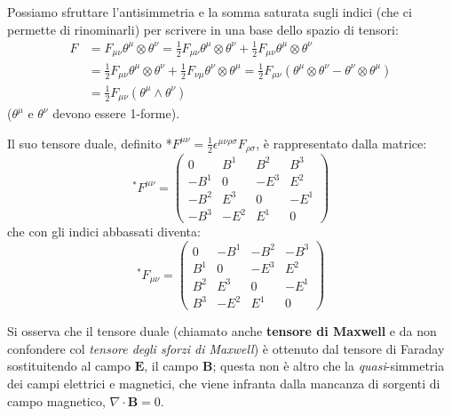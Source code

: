 Possiamo sfruttare l'antisimmetria e la somma saturata sugli indici (che ci permette di rinominarli) per scrivere in una base dello spazio di tensori:
\begin{align*}
    F &= F_{\mu\nu}\theta^\mu \otimes \theta^\nu = \frac{1}{2}F_{\mu\nu}\theta^\mu \otimes \theta^\nu + \frac{1}{2}F_{\mu\nu}\theta^\mu \otimes \theta^\nu \\
    &= \frac{1}{2}F_{\mu\nu}\theta^\mu \otimes \theta^\nu + \frac{1}{2}F_{\nu\mu}\theta^\nu \otimes \theta^\mu
    = \frac{1}{2}F_{\mu\nu}(\theta^\mu \otimes \theta^\nu - \theta^\nu \otimes \theta^\mu) \\
    &= \frac{1}{2}F_{\mu\nu}(\theta^{\mu} \wedge \theta^{\nu} )
\end{align*}
($\theta^\mu$ e $\theta^\nu$ devono essere 1-forme).

Il suo tensore duale, definito *$F^{\mu\nu} = \frac{1}{2}\epsilon^{\mu\nu\rho\sigma}F_{\rho\sigma}$, è rappresentato dalla matrice:
\begin{equation*}
^*F^{\mu\nu} =
    \begin{pmatrix}
    0 & B^1 & B^2 & B^3\\
    -B^1 & 0 & - E^3 & E^2 \\
    -B^2 & E^3 & 0 & -E^1 \\
    -B^3 & -E^2 & E^1 & 0
    \end{pmatrix}
\end{equation*}
che con gli indici abbassati diventa:
\begin{equation*}
    ^*F_{\mu\nu} =
    \begin{pmatrix}
    0 & -B^1 & -B^2 & -B^3 \\
    B^1 & 0 & - E^3 & E^2 \\
    B^2 & E^3 & 0 & -E^1 \\
    B^3 & -E^2 & E^1 & 0
    \end{pmatrix}
\end{equation*}

Si osserva che il tensore duale (chiamato anche \textbf{tensore di Maxwell} e da non confondere col \textit{tensore degli sforzi di Maxwell}) è ottenuto dal tensore di Faraday sostituitendo al campo $\bm{E}$, il campo $\bm{B}$; questa non è altro che la \textit{quasi}-simmetria dei campi elettrici e magnetici, che viene infranta dalla mancanza di sorgenti di campo magnetico, $\nabla \cdot \bm{B} = 0$.



